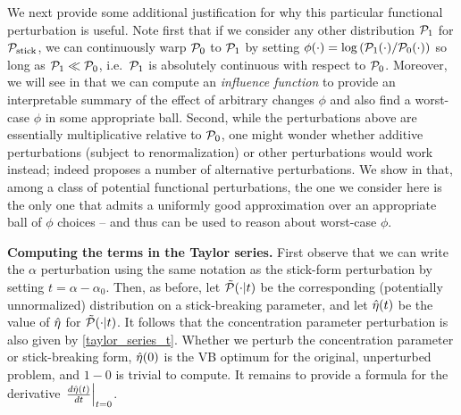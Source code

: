 We next provide some additional justification for why this particular functional
perturbation is useful. Note first that if we consider any other distribution
$\mathcal{P}_{1}$ for $\mathcal{P}_{\mathrm{stick}}$, we can continuously warp $\mathcal{P}_{0}$ to $\mathcal{P}_{1}$ by setting
$\phi(\cdot) = \log \left( \mathcal{P}_{1}(\cdot) / \mathcal{P}_{0}(\cdot) \right)$ so long as
$\mathcal{P}_{1} \ll \mathcal{P}_{0}$, i.e.\ $\mathcal{P}_{1}$ is absolutely continuous with respect to
$\mathcal{P}_{0}$. Moreover, we will see in  that we can
compute an \emph{influence function} to provide an interpretable summary of the
effect of arbitrary changes $\phi$ and also find a worst-case $\phi$ in some
appropriate ball. Second, while the perturbations above are essentially
multiplicative relative to $\mathcal{P}_{0}$, one might wonder whether additive
perturbations (subject to renormalization) or other perturbations would work
instead; indeed \citet{gustafson:1996:local} proposes a number of alternative
perturbations. We show in  that, among a class of
potential functional perturbations, the one we consider here is the only one
that admits a uniformly good approximation over an appropriate ball of $\phi$
choices -- and thus can be used to reason about worst-case $\phi$.

\noindent \textbf{Computing the terms in the Taylor series.} First observe that
we can write the $\alpha$ perturbation using the same notation as the stick-form
perturbation by setting $t = \alpha - \alpha_0$. Then, as before, let
$\tilde{\mathcal{P}}(\cdot \vert t)$ be the corresponding (potentially unnormalized)
distribution on a stick-breaking parameter, and let $\hat\eta(t)$ be the value of
$\hat\eta$ for $\tilde{\mathcal{P}}(\cdot \vert t)$. It follows that the concentration
parameter perturbation is also given by \eqref{taylor_series_t}. Whether we
perturb the concentration parameter or stick-breaking form, $\hat\eta(0)$ is the
VB optimum for the original, unperturbed problem, and $1-0$ is trivial to
compute. It remains to provide a formula for the derivative
$\left.\frac{d\hat\eta(t)}{dt}\right\vert_{t=0}$.
%

